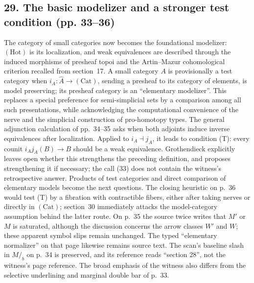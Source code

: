 \documentclass[10pt,oneside]{book}
\begin{document}
\subsection*{29. The basic modelizer and a stronger test condition (pp. 33--36)}
The category of small categories now becomes the foundational modelizer: $(\mathrm{Hot})$ is its localization, and weak equivalences are described through the induced morphisms of presheaf topoi and the Artin--Mazur cohomological criterion recalled from section~17. A small category $A$ is provisionally a test category when $i_A\colon\widehat A\to(\mathrm{Cat})$, sending a presheaf to its category of elements, is model preserving; its presheaf category is an ``elementary modelizer''. This replaces a special preference for semi-simplicial sets by a comparison among all such presentations, while acknowledging the computational convenience of the nerve and the simplicial construction of pro-homotopy types. The general adjunction calculation of pp.~34--35 asks when both adjoints induce inverse equivalences after localization. Applied to $i_A\dashv j_A$, it leads to condition (T): every counit $i_Aj_A(B)\to B$ should be a weak equivalence. Grothendieck explicitly leaves open whether this strengthens the preceding definition, and proposes strengthening it if necessary; the call (33) does not contain the witness's retrospective answer. Products of test categories and direct comparison of elementary models become the next questions. The closing heuristic on p.~36 would test (T) by a fibration with contractible fibers, either after taking nerves or directly in $(\mathrm{Cat})$; section~30 immediately attacks the model-category assumption behind the latter route. On p.~35 the source twice writes that $M'$ or $M$ is saturated, although the discussion concerns the arrow classes $W'$ and $W$; these apparent symbol slips remain unchanged. The typed ``elementary normalizer'' on that page likewise remains source text. The scan's baseline slash in $M/_{b}$ on p.~34 is preserved, and its reference reads ``section 28'', not the witness's page reference. The broad emphasis of the witness also differs from the selective underlining and marginal double bar of p.~33.
\end{document}
